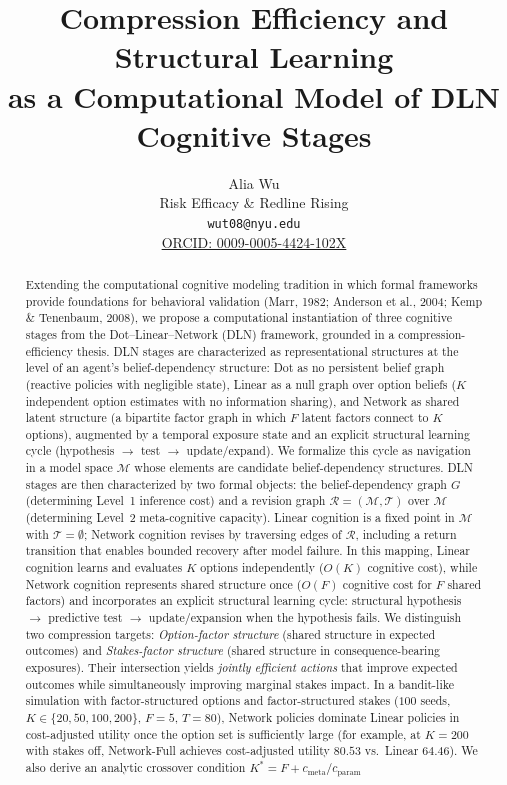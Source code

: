 \documentclass[11pt]{article}
\title{Compression Efficiency and Structural Learning\\as a Computational Model of DLN Cognitive Stages}
\author{
Alia Wu\\
Risk Efficacy \& Redline Rising\\
\texttt{wut08@nyu.edu}\\
\href{https://orcid.org/0009-0005-4424-102X}{ORCID: 0009-0005-4424-102X}
}
\date{}
\begin{document}
\maketitle

\begin{abstract}
Extending the computational cognitive modeling tradition in which formal frameworks provide foundations for behavioral validation (Marr, 1982; Anderson et al., 2004; Kemp \& Tenenbaum, 2008), we propose a computational instantiation of three cognitive stages from the Dot--Linear--Network (DLN) framework, grounded in a compression-efficiency thesis. DLN stages are characterized as representational structures at the level of an agent's belief-dependency structure: Dot as no persistent belief graph (reactive policies with negligible state), Linear as a null graph over option beliefs ($K$ independent option estimates with no information sharing), and Network as shared latent structure (a bipartite factor graph in which $F$ latent factors connect to $K$ options), augmented by a temporal exposure state and an explicit structural learning cycle (hypothesis $\rightarrow$ test $\rightarrow$ update/expand). We formalize this cycle as navigation in a model space $\mathcal{M}$ whose
elements are candidate belief-dependency structures.  DLN stages are then
characterized by two formal objects: the belief-dependency graph $G$
(determining Level~1 inference cost) and a revision graph
$\mathcal{R}=(\mathcal{M},\mathcal{T})$ over $\mathcal{M}$ (determining Level~2
meta-cognitive capacity).  Linear cognition is a fixed point in $\mathcal{M}$
with $\mathcal{T}=\emptyset$; Network cognition revises by traversing edges of
$\mathcal{R}$, including a return transition that enables bounded recovery after
model failure.
In this mapping, Linear cognition learns and evaluates $K$ options independently ($O(K)$ cognitive cost), while Network cognition represents shared structure once ($O(F)$ cognitive cost for $F$ shared factors) and incorporates an explicit structural learning cycle: structural hypothesis $\rightarrow$ predictive test $\rightarrow$ update/expansion when the hypothesis fails.
We distinguish two compression targets: \emph{Option-factor structure} (shared structure in expected outcomes) and \emph{Stakes-factor structure} (shared structure in consequence-bearing exposures). Their intersection yields \emph{jointly efficient actions} that improve expected outcomes while simultaneously improving marginal stakes impact.
In a bandit-like simulation with factor-structured options and factor-structured stakes ($100$ seeds, $K\in\{20,50,100,200\}$, $F{=}5$, $T{=}80$), Network policies dominate Linear policies in cost-adjusted utility once the option set is sufficiently large (for example, at $K{=}200$ with stakes off, Network-Full achieves cost-adjusted utility $80.53$ vs.\ Linear $64.46$). We also derive an analytic crossover condition $K^* = F + c_{\mathrm{meta}}/c_{\mathrm{param}}$

\end{abstract}
\end{document}
